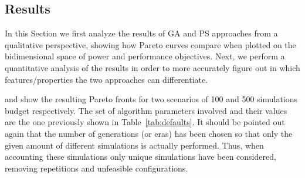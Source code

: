 \subsection{Results}

In this Section we first analyze the results of GA and PS approaches from a
qualitative perspective, showing how Pareto curves compare when
plotted on the bidimensional space of power and performance
objectives. Next, we perform a quantitative
analysis of the results in order to more accurately figure out in which
features/properties the two approaches can differentiate.

 and  show the
resulting Pareto fronts for two scenarios of 100 and 500
simulations budget respectively. The set of algorithm parameters involved and their
values are the one previously shown in Table~\ref{tab:defaults}. It
should be pointed out again that the number of generations (or eras)
has been chosen so that only the given amount of different simulations is
actually performed. Thus, when accounting these simulations only
unique simulations have been considered, removing repetitions and
unfeasible configurations.

%



